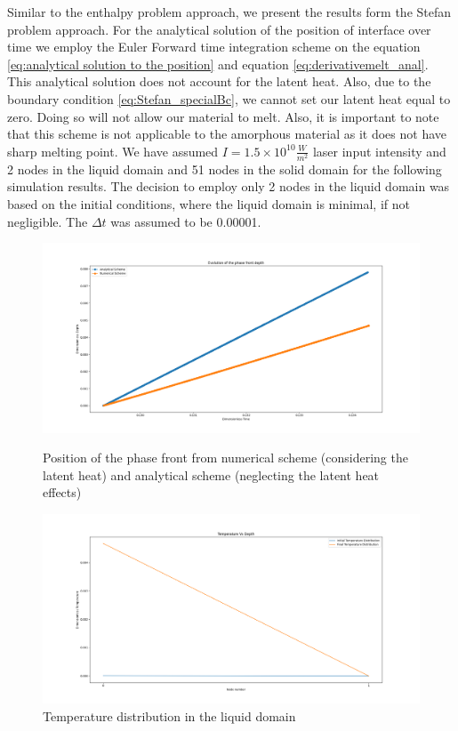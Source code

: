 Similar to the enthalpy problem approach, we present the results form the Stefan problem approach. For the analytical solution of the position of interface over time we employ the Euler Forward time integration scheme on the equation \ref{eq:analytical solution to the position}  and equation \ref{eq:derivativemelt_anal}. This analytical solution does not account for the latent heat. Also, due to the boundary condition \ref{eq:Stefan_specialBc}, we cannot set our latent heat equal to zero. Doing so will not allow our material to melt. Also, it is important to note that this scheme is not applicable to the amorphous material as it does not have sharp melting point. We have assumed $I = 1.5 \times 10^{10} \frac{W}{m^2}$ laser input intensity and 2 nodes in the liquid domain and 51 nodes in the solid domain for the following simulation results. The decision to employ only 2 nodes in the liquid domain was based on the initial conditions, where the liquid domain is minimal, if not negligible. The $\Delta t$ was assumed to be  0.00001.  
\begin{figure}[h]
  \centering
  \includegraphics[width=15cm]{img/StefanMelting.png}
  \caption{Position of the phase front from numerical scheme (considering the latent heat) and analytical scheme (neglecting the latent heat effects)}
  \label{fig:Stefan melt phase front}
  \centering
  \includegraphics[width=15cm]{img/Stefan_Temp1.png}
  \caption{Temperature distribution in the liquid domain}
  \label{fig:Stefan liq temp}
  \end{figure}
